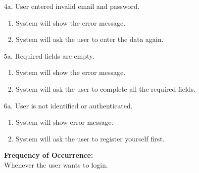 \documentclass[12pt]{article}
\begin{document}
4a. User entered invalid email and password.
\begin{enumerate}
\item System will show the error message.
\item System will ask the user to enter the data again.
\end{enumerate}
5a. Required fields are empty.
\begin{enumerate}
\item System will show the error message.
\item System will ask the user to complete all the required fields.
\end{enumerate}
6a. User is not identified or authenticated.
\begin{enumerate}
\item System will show error message.
\item System will ask the user to register yourself first.
\end{enumerate}
\textbf{Frequency of Occurrence:}\\
Whenever the user wants to login.
\end{document}
